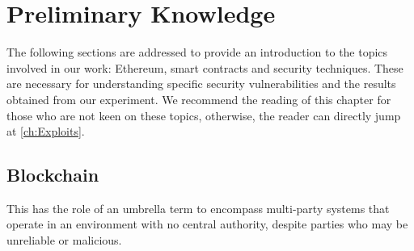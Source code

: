

\lstset{style=mystyle}
\chapter{Preliminary Knowledge}
\label{ch:Backgroud}

The following sections are addressed to provide an introduction to the topics involved in our work: Ethereum, smart contracts and security techniques.
These are necessary for understanding specific security vulnerabilities and the results obtained from our experiment.
We recommend the reading of this chapter for those who are not keen on these topics, otherwise, the reader can directly jump at \autoref{ch:Exploits}.

\section{Blockchain}
\label{sec:Backgroud:Bitcoin}
This has the role of an umbrella term to encompass multi-party 
systems that operate in an environment with no central authority, despite parties who may be 
unreliable or malicious. 

